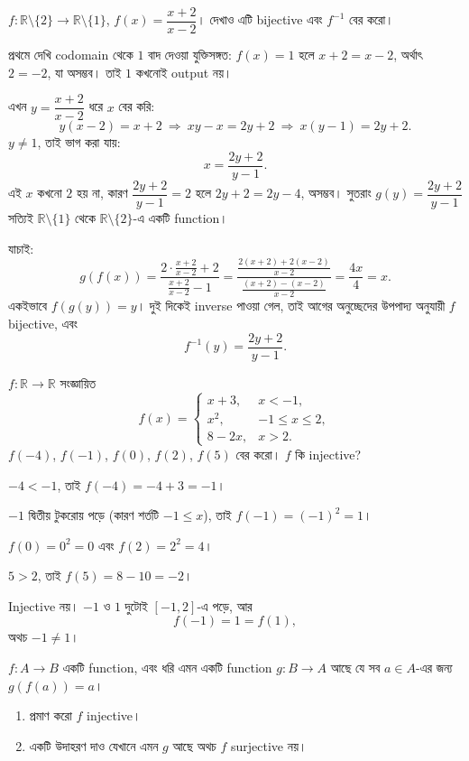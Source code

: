 \documentclass[11pt]{article}
\begin{document}
 $f \colon \mathbb{R} \setminus \{2\} \to \mathbb{R} \setminus \{1\}$,
$f(x) = \dfrac{x + 2}{x - 2}$। দেখাও এটি bijective এবং $f^{-1}$ বের করো।

\begin{sol}
প্রথমে দেখি codomain থেকে $1$ বাদ দেওয়া যুক্তিসঙ্গত: $f(x) = 1$ হলে
$x + 2 = x - 2$, অর্থাৎ $2 = -2$, যা অসম্ভব। তাই $1$ কখনোই output নয়।

এখন $y = \dfrac{x+2}{x-2}$ ধরে $x$ বের করি:
\[
  y(x - 2) = x + 2
  \ \Longrightarrow\ xy - x = 2y + 2
  \ \Longrightarrow\ x(y - 1) = 2y + 2 .
\]
$y \neq 1$, তাই ভাগ করা যায়:
\[
  x = \frac{2y + 2}{y - 1}.
\]
এই $x$ কখনো $2$ হয় না, কারণ $\dfrac{2y+2}{y-1} = 2$ হলে $2y + 2 = 2y - 4$,
অসম্ভব। সুতরাং $g(y) = \dfrac{2y+2}{y-1}$ সত্যিই $\mathbb{R} \setminus \{1\}$
থেকে $\mathbb{R} \setminus \{2\}$-এ একটি function।

যাচাই:
\[
  g(f(x)) = \frac{2 \cdot \frac{x+2}{x-2} + 2}{\frac{x+2}{x-2} - 1}
          = \frac{\frac{2(x+2) + 2(x-2)}{x-2}}{\frac{(x+2) - (x-2)}{x-2}}
          = \frac{4x}{4} = x .
\]
একইভাবে $f(g(y)) = y$। দুই দিকেই inverse পাওয়া গেল, তাই আগের অনুচ্ছেদের
উপপাদ্য অনুযায়ী $f$ bijective, এবং
\[
  f^{-1}(y) = \frac{2y + 2}{y - 1}.
\]
\end{sol}

 $f \colon \mathbb{R} \to \mathbb{R}$ সংজ্ঞায়িত
\[
  f(x) =
  \begin{cases}
    x + 3, & x < -1, \\[2pt]
    x^2, & -1 \leq x \leq 2, \\[2pt]
    8 - 2x, & x > 2 .
  \end{cases}
\]
$f(-4)$, $f(-1)$, $f(0)$, $f(2)$, $f(5)$ বের করো। $f$ কি injective?

\begin{sol}
$-4 < -1$, তাই $f(-4) = -4 + 3 = -1$।

$-1$ দ্বিতীয় টুকরোয় পড়ে (কারণ শর্তটি $-1 \leq x$), তাই $f(-1) = (-1)^2 = 1$।

$f(0) = 0^2 = 0$ এবং $f(2) = 2^2 = 4$।

$5 > 2$, তাই $f(5) = 8 - 10 = -2$।

Injective নয়। $-1$ ও $1$ দুটোই $[-1, 2]$-এ পড়ে, আর
\[
  f(-1) = 1 = f(1),
\]
অথচ $-1 \neq 1$।
\end{sol}

 $f \colon A \to B$ একটি function, এবং ধরি এমন একটি function
$g \colon B \to A$ আছে যে সব $a \in A$-এর জন্য $g(f(a)) = a$।
\begin{enumerate}
  \item প্রমাণ করো $f$ injective।
  \item একটি উদাহরণ দাও যেখানে এমন $g$ আছে অথচ $f$ surjective নয়।
\end{enumerate}
\end{document}
